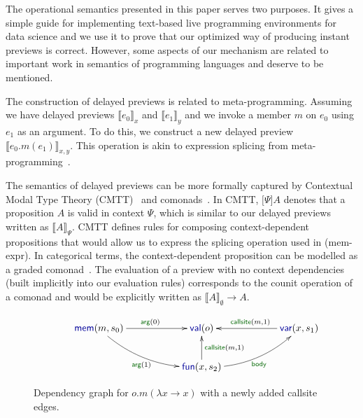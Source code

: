 \documentclass[english,crc,references=cleveref]{programming}
\theoremstyle{plain}
\theoremstyle{definition}
\newcommand{\bnd}[1]{\textnormal{\textcolor{kvdclr}{\sffamily #1}}}
\newcommand{\blbl}[1]{\textnormal{\textcolor{numclr}{\sffamily #1}}}
\newcommand{\rname}[1]{{\sffamily(#1)}}
\begin{document}
The operational semantics presented in this paper serves two purposes. It gives a simple guide
for implementing text-based live programming environments for data science and we use it to prove that
our optimized way of producing instant previews is correct. However, some aspects of our mechanism
are related to important work in semantics of programming languages and deserve to be mentioned.

The construction of delayed previews is related to meta-programming. Assuming
we have delayed previews $\llbracket e_0 \rrbracket_x$ and $\llbracket e_1 \rrbracket_y$ and
we invoke a member $m$ on $e_0$ using $e_1$ as an argument. To do this, we construct a new
delayed preview $\llbracket e_0.m(e_1) \rrbracket_{x, y}$. This operation is akin to expression
splicing from meta-programming~\cite{metaml,quotations}.

The semantics of delayed previews can be more formally captured by Contextual Modal Type Theory
(CMTT)~\cite{cmtt} and comonads~\cite{cmtt-denotation}. In CMTT, $\lbrack \Psi \rbrack A$ denotes
that a proposition $A$ is valid in context $\Psi$, which is similar to our delayed previews written
as $\llbracket A \rrbracket_\Psi$. CMTT defines rules for composing context-dependent propositions
that would allow us to express the splicing operation used in \rname{mem-expr}. In categorical
terms, the context-dependent proposition can be modelled as a graded comonad~\cite{effectrev,graded}.
The evaluation of a preview with no context dependencies (built implicitly into our evaluation rules)
corresponds to the counit operation of a comonad and would be explicitly written as
$\llbracket A \rrbracket_\emptyset \rightarrow A$.


\begin{figure}
\vspace{-0.5em}
\begin{equation*}
\hspace{3em}
\xymatrix{
\bnd{mem}(m, s_0) \ar@/_1pc/[drr]_{\blbl{arg}(1)} \ar[rr]^{\blbl{arg}(0)} && \bnd{val}(o) && \bnd{var}(x, s_1)\ar[ll]_{\blbl{callsite}(m, 1)} \\
&&\bnd{fun}(x, s_2) \ar[u]_{\blbl{callsite}(m, 1)} \ar@/_1pc/[rru]_{\blbl{body}} &&
}
\end{equation*}
\vspace{-0.5em}
\caption{Dependency graph for $o.m(\lambda x\rightarrow x)$ with a newly added \blbl{callsite} edges.}
\label{fig:graph-func}
\vspace{-0.5em}
\end{figure}
\end{document}
